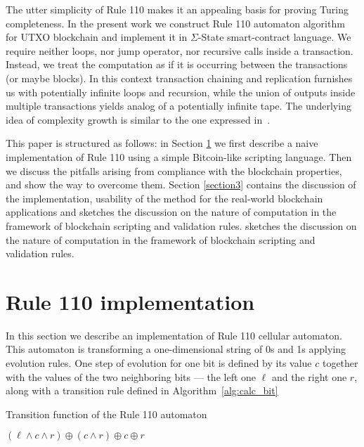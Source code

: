 \documentclass[runningheads]{llncs}
\begin{document}
    The utter simplicity of Rule 110 makes it an appealing basis for proving Turing completeness. 
    In the present work we construct Rule 110 automaton algorithm for UTXO blockchain
    and implement it in $\Sigma$-State smart-contract language\cite{chepurnoy2017sigma}.
    We require neither loops, nor jump
    operator, nor recursive calls inside a transaction. Instead, we treat the
    computation as if it is occurring between the transactions (or maybe
    blocks). In this context transaction chaining and replication furnishes us
    with potentially infinite loops and recursion, while the union of outputs
    inside multiple transactions yields analog of a potentially infinite tape.
    The underlying idea of complexity growth is similar to the one expressed
    in~\cite{von1951general,von1966theory}.

    This paper is structured as follows: in Section \ref{section2} we first
    describe a naive implementation of Rule 110 using a simple Bitcoin-like
    scripting language.  Then we discuss the pitfalls arising from compliance
    with the blockchain properties, and show the way to overcome them.  Section
    \ref{section3} contains the discussion of the implementation, usability of
    the method for the real-world blockchain applications and sketches the
    discussion on the nature of computation in the framework of blockchain
    scripting and validation rules.
     sketches the discussion on the nature of
    computation in the framework of blockchain scripting and validation rules.

    \section{Rule 110 implementation}
    \label{section2}

    In this section we describe an implementation of Rule 110 cellular automaton. This automaton
    is transforming a one-dimensional string of 0s and 1s applying evolution rules. One
    step of evolution for one bit is defined by its value $c$ together with the
    values of the two neighboring bits --- the left one $\ell$ and the right one $r$, along with a 
    transition rule defined in Algorithm~\ref{alg:calc_bit}

    \begin{algorithm}[H]
        \caption{Transition function of the Rule 110 automaton}
        \label{alg:calc_bit}
        \begin{algorithmic}[1]
            \State
            \Return $(\ell\wedge c\wedge r) \oplus (c\wedge r) \oplus c \oplus r$
            \EndFunction
        \end{algorithmic}
    \end{algorithm}
\end{document}
